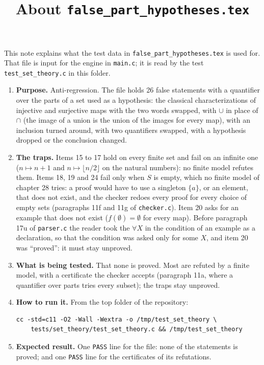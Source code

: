 \documentclass[11pt,a4paper]{article}
\title{About \texttt{false\_part\_hypotheses.tex}}
\author{}
\date{}
\begin{document}
\maketitle
This note explains what the test data in \texttt{false\_part\_hypotheses.tex} is used for. That file is input for the engine in \texttt{main.c}; it is read by the test \texttt{test\_set\_theory.c} in this folder.

\begin{enumerate}
\item \textbf{Purpose.} Anti-regression. The file holds 26 false statements with a quantifier over the parts of a set used as a hypothesis: the classical characterizations of injective and surjective maps with the two words swapped, with $\cup$ in place of $\cap$ (the image of a union is the union of the images for every map), with an inclusion turned around, with two quantifiers swapped, with a hypothesis dropped or the conclusion changed.

\item \textbf{The traps.} Items 15 to 17 hold on every finite set and fail on an infinite one ($n \mapsto n + 1$ and $n \mapsto \lfloor n / 2 \rfloor$ on the natural numbers): no finite model refutes them. Items 18, 19 and 24 fail only when $S$ is empty, which no finite model of chapter 28 tries: a proof would have to use a singleton $\{a\}$, or an element, that does not exist, and the checker redoes every proof for every choice of empty sets (paragraphs 11f and 11g of \texttt{checker.c}). Item 20 asks for an example that does not exist ($f(\emptyset) = \emptyset$ for every map). Before paragraph 17u of \texttt{parser.c} the reader took the $\forall X$ in the condition of an example as a declaration, so that the condition was asked only for some $X$, and item 20 was ``proved'': it must stay unproved.

\item \textbf{What is being tested.} That none is proved. Most are refuted by a finite model, with a certificate the checker accepts (paragraph 11a, where a quantifier over parts tries every subset); the traps stay unproved.

\item \textbf{How to run it.} From the top folder of the repository:
\begin{verbatim}
cc -std=c11 -O2 -Wall -Wextra -o /tmp/test_set_theory \
    tests/set_theory/test_set_theory.c && /tmp/test_set_theory
\end{verbatim}

\item \textbf{Expected result.} One \texttt{PASS} line for the file: none of the statements is proved; and one \texttt{PASS} line for the certificates of its refutations.
\end{enumerate}
\end{document}
